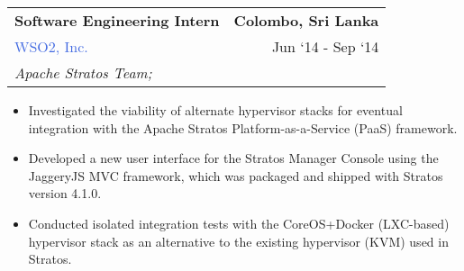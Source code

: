 \documentclass[10pt]{article}
\newcommand{\highlightcolor}{RoyalBlue}
\newcommand{\tabularxwidth}{\textwidth}
\begin{document}
    \begin{minipage}{\tabularxwidth}

        \begin{tabularx}{\tabularxwidth}{X r}
            \textbf{Software Engineering Intern} & \textbf{Colombo, 
        Sri Lanka} \\
            
    
    
    

    
        \textcolor{\highlightcolor}{WSO2, Inc.} & 
        
    Jun ‘14 - 
    Sep ‘14 \\
        
            \textit{Apache Stratos Team;}
                \textit{} & \\
        
    
            
        \end{tabularx}

        \begin{itemize}[noitemsep, topsep=3pt, parsep=0pt, partopsep=0pt]
            
                \item 
    Investigated the viability of alternate hypervisor stacks for eventual integration with the Apache Stratos Platform-as-a-Service (PaaS) framework.
            
                \item 
    Developed a new user interface for the Stratos Manager Console using the JaggeryJS MVC framework, which was packaged and shipped with Stratos version 4.1.0.
            
                \item 
    Conducted isolated integration tests with the CoreOS+Docker (LXC-based) hypervisor stack as an alternative to the existing hypervisor (KVM) used in Stratos.
            
        \end{itemize}

        
            \vspace{.5em}
        

    \end{minipage}
    
\end{document}

